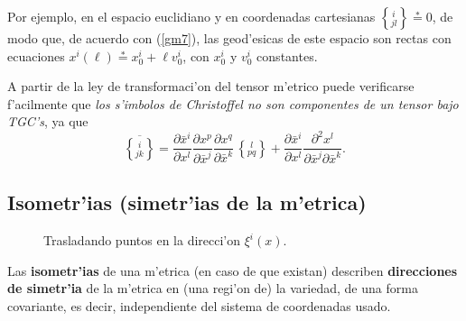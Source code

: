 Por ejemplo, en el espacio euclidiano y en coordenadas cartesianas
$\left\{_{ j l}^{\, i}\right\}\overset{\ast}{=}0$, de modo que, de acuerdo con
(\ref{gm7}), las geod'esicas de este espacio son rectas con ecuaciones
$x^i (\ell)\overset{\ast}{=}x_0^i +\ell v_0^i $, con $x_0^i $ y $v_0^i$ constantes.

A partir de la ley de transformaci'on del tensor m'etrico puede verificarse f'acilmente que \textit{los s'imbolos de Christoffel no son componentes de un tensor bajo TGC's}, ya que
\begin{equation}
\overline{\left\{_{j k}^{\,\, i}\right\}}=\frac{\partial\bar{x}^i}{\partial x^l }\frac{\partial
x^p}{\partial\bar{x}^j }\frac{\partial x^q}{\partial\bar{x}^k }\,
\left\{_{p q}^{\,\, l}\right\} +\frac{\partial\bar{x}^i}{\partial x^l }\frac{\partial
^2x^l }{\partial\bar{x}^j \partial\bar{x}^k }. \label{dinv7}
\end{equation}

\subsection{Isometr'ias (simetr'ias de la m'etrica)}
\begin{center}
\begin{figure}[H]
\centerline{}
\caption{Trasladando puntos en la direcci'on $\xi^i(x)$.}
\label{fig:Killing}
\end{figure}
\end{center}
Las \textbf{isometr'ias} de una m'etrica (en caso de que existan) describen \textbf{direcciones de simetr'ia} de la m'etrica en (una regi'on de) la variedad, de una forma covariante, es decir, independiente del sistema de coordenadas usado. 


